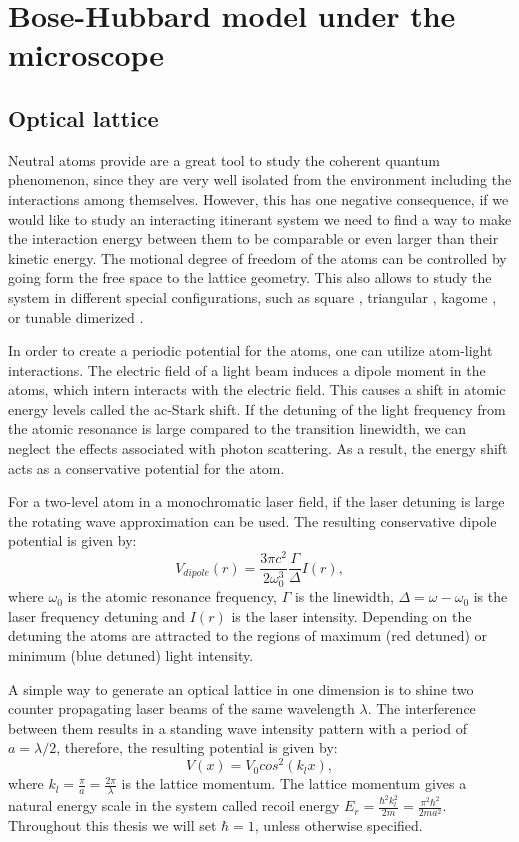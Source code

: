 
\chapter{Bose-Hubbard model under the microscope}

\section{Optical lattice}
Neutral atoms provide are a great tool to study the coherent quantum phenomenon, since they are very well isolated from the environment including the interactions among themselves. However, this has one negative consequence, if we would like to study an interacting itinerant system we need to find a way to make the interaction energy between them to be comparable or even larger than their kinetic energy. The motional degree of freedom of the atoms can be controlled by going form the free space to the lattice geometry. This also allows to study the system in different special configurations, such as square \cite{Greiner2002}, triangular \cite{Becker2010}, kagome \cite{Jo2012}, or tunable dimerized \cite{Greif2013}.

In order to create a periodic potential for the atoms, one can utilize atom-light interactions. The electric field of a light beam induces a dipole moment in the atoms, which intern interacts with the electric field. This causes a shift in atomic energy levels called the ac-Stark shift. If the detuning of the light frequency from the atomic resonance is large compared to the transition linewidth, we can neglect the effects associated with photon scattering. As a result, the energy shift acts as a conservative potential for the atom.

For a two-level atom in a monochromatic laser field, if the laser detuning is large the rotating wave approximation can be used. The resulting conservative dipole potential is given by:
\begin{equation}
V_{dipole}(r) = \frac{3\pi c^2}{2\omega_0^3} \frac{\Gamma}{\Delta} I(r),
\end{equation}
where $\omega_0$ is the atomic resonance frequency, $\Gamma$ is the linewidth, $\Delta = \omega-\omega_0$ is the laser frequency detuning and $I(r)$ is the laser intensity. Depending on the detuning the atoms are attracted to the regions of maximum (red detuned) or minimum (blue detuned) light intensity. 

A simple way to generate an optical lattice in one dimension is to shine two counter propagating laser beams of the same wavelength $\lambda$. The interference between them results in a standing wave intensity pattern with a period of $a=\lambda/2$, therefore, the resulting potential is given by:
\begin{equation}
V(x) = V_0cos^2(k_l x),
\end{equation}
where $k_l = \frac{\pi}{a} =\frac{2\pi}{\lambda}$ is the lattice momentum. The lattice momentum gives a natural energy scale in the system called recoil energy $E_r = \frac{\hbar^2 k_l^2}{2m} = \frac{\pi^2 \hbar^2}{2 m a^2}$. Throughout this thesis we will set $\hbar=1$, unless otherwise specified.

